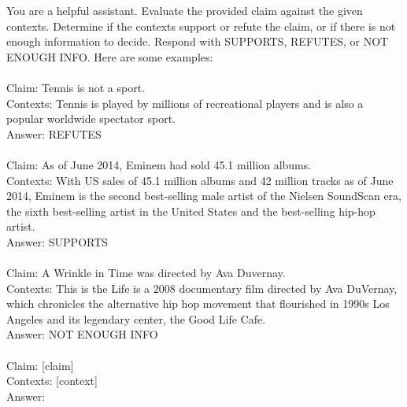 \begin{tcolorbox}[title= Prompt used in RAG for fact verification.]
You are a helpful assistant. Evaluate the provided claim against the given contexts. Determine if the contexts support or refute the claim, or if there is not enough information to decide. Respond with SUPPORTS, REFUTES, or NOT ENOUGH INFO. Here are some examples:   \\ \\
Claim: Tennis is not a sport. \\Contexts: Tennis is played by millions of recreational players and is also a popular worldwide spectator sport. \\Answer: REFUTES\
\\ \\Claim: As of June 2014, Eminem had sold 45.1 million albums. \\Contexts: With US sales of 45.1 million albums and 42 million tracks as of June 2014, Eminem is the second best-selling male artist of the Nielsen SoundScan era, the sixth best-selling artist in the United States and the best-selling hip-hop artist. \\Answer: SUPPORTS\
\\ \\Claim: A Wrinkle in Time was directed by Ava Duvernay. \\Contexts: This is the Life is a 2008 documentary film directed by Ava DuVernay, which chronicles the alternative hip hop movement that flourished in 1990s Los Angeles and its legendary center, the Good Life Cafe. \\Answer: NOT ENOUGH INFO\
\\ \\Claim: [claim] \\Contexts: [context] \\Answer:
\end{tcolorbox}









